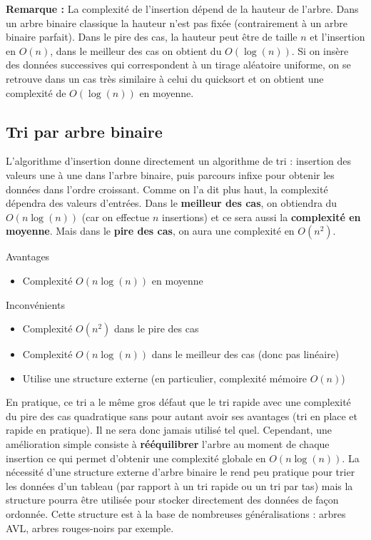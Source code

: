\documentclass{../cours}
\begin{document}
\textbf{Remarque :} La complexité de l'insertion dépend de la hauteur de l'arbre. Dans un arbre binaire classique la hauteur n'est pas fixée (contrairement à un arbre binaire parfait). Dans le pire des cas, la hauteur peut être de taille $n$ et l'insertion en $O(n)$, dans le meilleur des cas on obtient du $O(\log(n))$. Si on insère des données successives qui correspondent à un tirage aléatoire uniforme, on se retrouve dans un cas très similaire à celui du quicksort et on obtient une complexité de $O(\log(n))$ en moyenne.

\subsection{Tri par arbre binaire}

L'algorithme d'insertion donne directement un algorithme de tri : insertion des valeurs une à une dans l'arbre binaire, puis parcours infixe pour obtenir les données dans l'ordre croissant. Comme on l'a dit plus haut, la complexité dépendra des valeurs d'entrées. Dans le \textbf{meilleur des cas}, on obtiendra du $O(n\log(n))$ (car on effectue $n$ insertions) et ce sera aussi la \textbf{complexité en moyenne}. Mais dans le \textbf{pire des cas}, on aura une complexité en $O(n^2)$.

\begin{minipage}[t]{0.49 \textwidth}
Avantages

\begin{itemize}
\item Complexité $O(n \log(n))$ en moyenne
\end{itemize}

\end{minipage}
\begin{minipage}[t]{0.49 \textwidth}
Inconvénients

\begin{itemize}
\item Complexité $O(n^2)$ dans le pire des cas
\item Complexité $O(n \log(n))$ dans le meilleur des cas (donc pas linéaire)
\item Utilise une structure externe (en particulier, complexité mémoire $O(n)$)
\end{itemize}
\end{minipage}

En pratique, ce tri a le même gros défaut que le tri rapide avec une complexité du pire des cas quadratique sans pour autant avoir ses avantages (tri en place et rapide en pratique). Il ne sera donc jamais utilisé tel quel. Cependant, une amélioration simple consiste à \textbf{rééquilibrer} l'arbre au moment de chaque insertion ce qui permet d'obtenir une complexité globale en $O(n\log(n))$. La nécessité d'une structure externe d'arbre binaire le rend peu pratique pour trier les données d'un tableau (par rapport à un tri rapide ou un tri par tas) mais la structure pourra être utilisée pour stocker directement des données de façon ordonnée. Cette structure est à la base de nombreuses généralisations : arbres AVL, arbres rouges-noirs par exemple.
\end{document}
